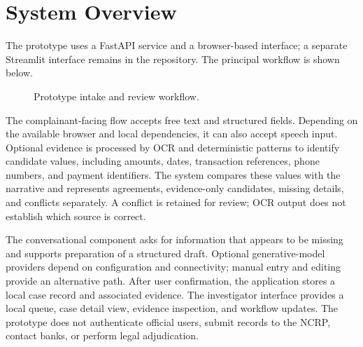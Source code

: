 \documentclass[conference]{IEEEtran}
\begin{document}
\section{System Overview}
The prototype uses a FastAPI service and a browser-based interface; a separate Streamlit interface remains in the repository. The principal workflow is shown below.
\begin{figure}[t]
\centering
{}
\caption{Prototype intake and review workflow.}
\label{fig:workflow}
\end{figure}

The complainant-facing flow accepts free text and structured fields. Depending on the available browser and local dependencies, it can also accept speech input. Optional evidence is processed by OCR and deterministic patterns to identify candidate values, including amounts, dates, transaction references, phone numbers, and payment identifiers. The system compares these values with the narrative and represents agreements, evidence-only candidates, missing details, and conflicts separately. A conflict is retained for review; OCR output does not establish which source is correct.

The conversational component asks for information that appears to be missing and supports preparation of a structured draft. Optional generative-model providers depend on configuration and connectivity; manual entry and editing provide an alternative path. After user confirmation, the application stores a local case record and associated evidence. The investigator interface provides a local queue, case detail view, evidence inspection, and workflow updates. The prototype does not authenticate official users, submit records to the NCRP, contact banks, or perform legal adjudication.
\end{document}
